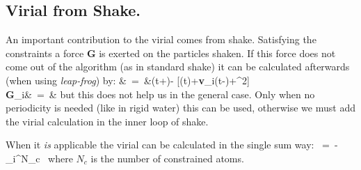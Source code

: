\subsection{Virial from Shake.}
An important contribution to the virial comes from shake. Satisfying 
the constraints a force {\bf G} is exerted on the particles shaken. If this
force does not come out of the algorithm (as in standard shake) it can be
calculated afterwards (when using {\em leap-frog}) by:
\bea
\Delta\rvi&~=~&\rvi(t+\Dt)-
[\rvi(t)+{\bf v}_i(t-)\Dt+\Dt^2]	\\
{\bf G}_i&~=~&
\eea
but this does not help us in the general case. Only when no periodicity
is needed (like in rigid water) this can be used, otherwise
we must add the virial calculation in the inner loop of shake.

When it {\em is} applicable the virial can be calculated in the single sum way:
\beq
\Xi~=~-\half\sum_i^{N_c}~\rvi\otimes\Fvi
\eeq
where $N_c$ is the number of constrained atoms.



